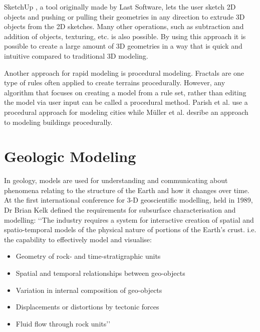 \documentclass[a4paper,12pt]{report}
\begin{document}
SketchUp \cite{sketchup}, a tool originally made by Last Software, lets the user sketch 2D objects and pushing or pulling their geometries in any direction to extrude 3D objects from the 2D sketches. Many other operations, such as subtraction and addition of objects, texturing, etc. is also possible. By using this approach it is possible to create a large amount of 3D geometries in a way that is quick and intuitive compared to traditional 3D modeling.

Another approach for rapid modeling is procedural modeling. Fractals are one type of rules often applied to create terrains procedurally.  However, any algorithm that focuses on creating a model from a rule set, rather than editing the model via user input can be called a procedural method. Parish et al. \cite{parish2001procedural} use a procedural approach for modeling cities while Müller \cite{muller2006procedural} et al. desribe an approach to modeling buildings procedurally. 
 

\section{Geologic Modeling}
In geology, models are used for understanding and communicating about phenomena relating to the structure of the Earth and how it changes over time. At the first international conference for 3-D geoscientific modelling, held in 1989, Dr Brian Kelk defined the requirements for subsurface characterisation and modelling:
‘‘The industry requires a system for interactive creation
of spatial and spatio-temporal models of the physical
nature of portions of the Earth’s crust. i.e. the
capability to effectively model and visualise:
\begin{itemize}
 \item Geometry of rock- and time-stratigraphic units
 \item Spatial and temporal relationships between geo-objects
 \item Variation in internal composition of geo-objects
 \item Displacements or distortions by tectonic forces
 \item Fluid flow through rock units’’ \cite{turner1992three}
\end{itemize}
\end{document}
